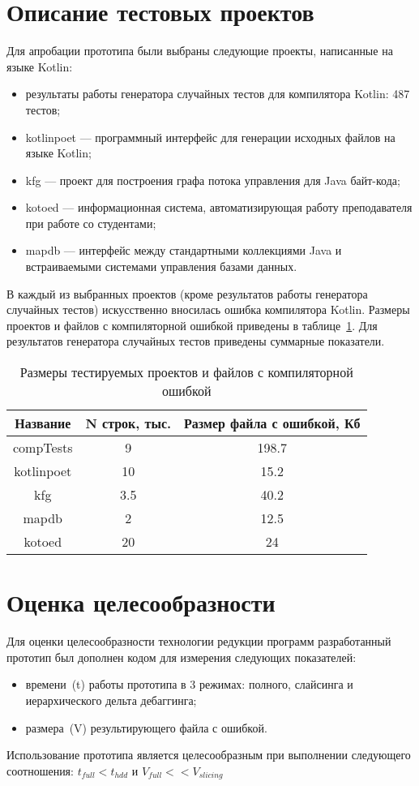 \section{Описание тестовых проектов}
Для апробации прототипа были выбраны следующие проекты, написанные на языке Kotlin:
\begin{itemize}
\item результаты работы генератора случайных тестов для компилятора Kotlin: 487 тестов;
\item kotlinpoet --- программный интерфейс для генерации исходных файлов на языке Kotlin; 
\item kfg --- проект для построения графа потока управления для Java байт-кода;
\item kotoed --- информационная система, автоматизирующая работу преподавателя при работе со студентами;
\item mapdb --- интерфейс между стандартными коллекциями Java и встраиваемыми системами управления базами данных.
\end{itemize}
%
В каждый из выбранных проектов (кроме результатов работы генератора случайных тестов) искусственно вносилась ошибка компилятора Kotlin. Размеры проектов и файлов с компиляторной ошибкой приведены в таблице~\ref{tab:size}. Для результатов генератора случайных тестов приведены суммарные показатели.
%
\begin{table}[]
\center
\captionsetup{skip=5pt}
\caption{\label{tab:size}Размеры тестируемых проектов и файлов с компиляторной ошибкой}
\begin{tabular}{| c | c | c |}
\hline
\bf Название & \bf N строк, тыс. & \bf Размер файла с ошибкой, Кб \\
\hline
compTests & 9 & 198.7\\
\hline
kotlinpoet & 10 & 15.2\\
\hline
kfg & 3.5 & 40.2\\
\hline
mapdb & 2 & 12.5\\
\hline
kotoed & 20 & 24\\
\hline
\end{tabular}
\end{table}

\section{Оценка целесообразности}
Для оценки целесообразности технологии редукции программ разработанный прототип был дополнен кодом для измерения следующих показателей:
\begin{itemize}
\item времени~(t) работы прототипа в 3 режимах: полного, слайсинга и иерархического дельта дебаггинга;
\item размера~(V) результирующего файла с ошибкой.
\end{itemize}
Использование прототипа является целесообразным при выполнении следующего соотношения: $t_{full} < t_{hdd}$ и $V_{full} << V_{slicing}$


